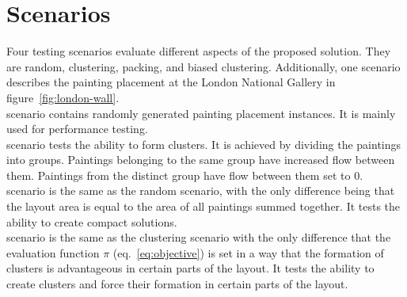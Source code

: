 \section{Scenarios}\label{sec:scenarios}

Four testing scenarios evaluate different aspects of the proposed solution.
They are random, clustering, packing, and biased clustering.
Additionally, one scenario describes the painting placement at the London National Gallery in figure~\ref{fig:london-wall}. \\

 scenario contains randomly generated painting placement instances.
It is mainly used for performance testing.
\\

 scenario tests the ability to form clusters.
It is achieved by dividing the paintings into groups.
Paintings belonging to the same group have increased flow between them.
Paintings from the distinct group have flow between them set to 0.
\\

 scenario is the same as the random scenario, with the only difference being that the layout area is equal to the area of all paintings summed together.
It tests the ability to create compact solutions.
\\

 scenario is the same as the clustering scenario with the only difference
that the evaluation function $\pi$ (eq.~\ref{eq:objective})
is set in a way that the formation of clusters is advantageous in certain parts of the layout.
It tests the ability to create clusters and force their formation in certain parts of the layout.\\
